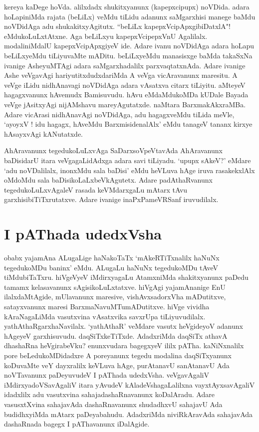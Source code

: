 kereya kaDege hoVda. alilxdadx shukitxyanunx (kapepxcipupx) noVDida. adara hoLapiniMda rajata (beLiLx) veMdu tiLidu adanunx saMgarxhisi manege baMdu noVDidAga adu shukakitxyAgitutx. ``beLiLx kapepxVcipApxgibiDatxlA"! eMdukoLuLxtAtxne. Aga beLiLxyu kapepxVcipepxVnU Agalilalx. modaliniMdalU kapepxVcipApxgiyeV ide. Adare ivanu noVDidAga adara hoLapu beLiLxyeMdu tiLiyuvaMte mADitu. beLiLxyeMdu manasisxge baMda takaSxNa ivanige AsheyuMTAgi adara saMgarxhadalilx parxvaqtatxnAda. Adare ivanige Ashe veVgavAgi hariyutitxdudxdariMda A veVga vicAravanunx maresitu. A veVge iLidu nidhAnavagi noVDidAga adara vAsatxva citarx tiLiyitu. aMteyeV hagagxvanunx hAvemudx  Bamisuvudu. hAvu eMdaMdukoMDa kUDale Bayada veVge jAsitxyAgi nijAMshavu mareyAgutatxde. naMtara BarxmakAkxraMBa. Adare vicArasi nidhAnavAgi noVDidAga, adu hagagxveMdu tiLida meVle, `ayoyxV ! idu hagagx, hAveMdu BarxmisidenalAlx' eMdu tanageV tananx kirxye hAsayxvAgi kANutatxde.

AhAravanunx tegedukoLuLxvAga SaDarxsoVpeVtavAda AhAravanunx baDisidarU itara veVgagaLidAdxga adara savi tiLiyadu. `upupx sAkeV?' eMdare `adu noVDalilalx, inonxMdu sala baDisi' eMdu heVLuva hAge iruva rasakekxlAlx oMdoMdu sala baDisikoLaLxbeVkAgutetx. Adare padAthaRvanunx tegedukoLuLxvAgaleV rasada keVMdarxgaLu mAtarx tAvu garxhisibiTiTxrutatxve. Adare ivanige inaPxPameVRSanf iruvudilalx.

\section*{I pAThada udedxVsha}

obabx yajamAna ALugaLige haNakoTaTx `mAkeRTiTxnalilx haNuNx  tegedukoMDu baninx' eMdu. ALugaLu haNuNx tegedukoMDu tAveV tiMdubiTaTxru. hiVgeVyeV iMdirxyagaLu AtamxniMda shakitxyanunx paDedu tamamx kelasavanunx sAgisikoLuLxtatxve. hiVgAgi yajamAnanige EnU ilalxdaMtAgide, mUlavanunx maresive, vishAvxsadorxVha mADutitxve, satayxvanunx maresi BarxmaNavuMTumADutitxve. hiVge vividha kAraNagaLiMda vasutxvina vAsatxvika savxrUpa tiLiyuvudilalx. yathAthaRgarxhaNavilalx. `yathAthaR' veMdare vasutx heVgideyoV adanunx hAgeyeV garxhisuvudu. daqSiTxkeTiTxde. AdadxriMda daqSiTx athavA dhashaRna heVgirabeVku? enunxvudara bagegxyeV ililx pATha. kaNiNxnalilx pore beLedukoMDidadxre A poreyanunx tegedu modalina daqSiTxyanunx koDuvaMte  veY dayxralilx keVLuva hAge, purAtanavU sanAtanavU Ada noVTavanunx paDeyuvudeV I pAThada udedxVsha. veVgavAgaliV iMdirxyadoVSavAgaliV itara yAvudeV kAladeVshagaLalilxna vayxtAyxsavAgaliV idadxlilx adu vasutxvina sahajadashaRnavanunx koDalAradu. Adare vasusxtXvina sahajavAda dashaRnavanunx shudadhxvU sahajavU Ada budidhxyiMda mAtarx paDeyabahudu. AdadxriMda niviRkAravAda sahajavAda  dashaRnada bagegx I pAThavanunx iDalAgide.
  


